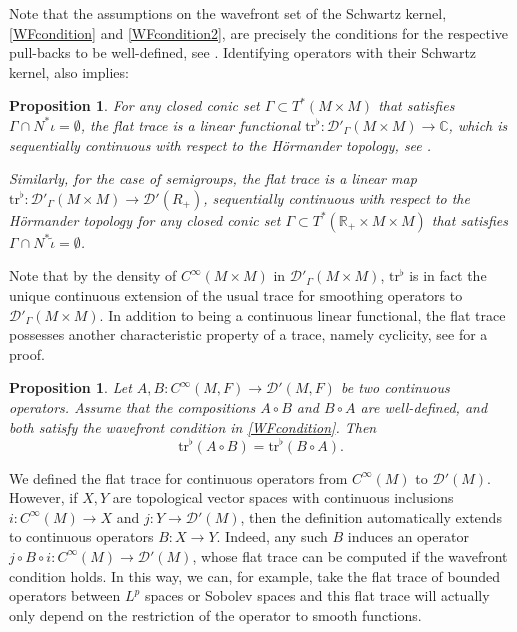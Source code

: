 \documentclass[reqno]{amsart}
\newtheorem{prop}[thm]{Proposition}
\theoremstyle{definition}
\theoremstyle{remark}
\newcommand{\R}{\mathbb{R}}
\newcommand{\D}{\mathcal{D}'}
\newcommand{\C}{C^\infty}
\newcommand{\tr}{\mathrm{tr}^\flat}
\begin{document}
Note that the assumptions on the wavefront set of the Schwartz kernel, \eqref{WFcondition} and \eqref{WFcondition2}, are precisely the conditions for the respective pull-backs to be well-defined, see \cite[Theorem 8.2.4]{hormander1}. Identifying operators with their Schwartz kernel, \cite[Theorem 8.2.4]{hormander1} also implies:

\begin{prop}
\label{continuity}
For any closed conic set $\Gamma \subset T^*(M\times M)$ that satisfies ${\Gamma \cap N^*\iota = \emptyset}$, the flat trace is a linear functional $\tr \colon \D_\Gamma(M\times M) \to \mathbb{C}$, which is sequentially continuous with respect to the H\"ormander topology, see \cite[Definition 8.2.2]{hormander1}.

Similarly, for the case of semigroups, the flat trace is a linear map $\tr \colon \D_\Gamma(M\times M) \to \D(R_+)$, sequentially continuous with respect to the Hörmander topology for any closed conic set $\Gamma \subset T^*(\R_+\times M\times M)$ that satisfies ${\Gamma \cap N^*\tilde{\iota} = \emptyset}$.
\end{prop}

Note that by the density of $\C(M\times M)$ in $\D_\Gamma(M\times M)$, $\tr$ is in fact the unique continuous extension of the usual trace for smoothing operators to $\D_\Gamma(M\times M)$. In addition to being a continuous linear functional, the flat trace possesses another characteristic property of a trace, namely cyclicity, see \cite[Section 4.5]{VietDangDynamicalTorsion} for a proof.
\begin{prop}
\label{cyclicity}
Let $A,B: \C(M,F) \to \D(M,F)$ be two continuous operators. Assume that the compositions $A\circ B$ and $B\circ A$ are well-defined,
and both satisfy the wavefront condition in \eqref{WFcondition}. Then
$$\tr(A\circ B) = \tr(B\circ A).$$
\end{prop}


\begin{rmk}
\label{spaces}
We defined the flat trace for continuous operators from $\C(M)$ to $\D(M)$. However, if $X, Y$ are topological vector spaces with continuous inclusions $i: \C(M) \to X$ and $j: Y \to \D(M)$, then the definition automatically extends to continuous operators $B:X\to Y$. Indeed, any such $B$ induces an operator $j\circ B\circ i \colon \C(M) \to \D(M)$, whose flat trace can be computed if the wavefront condition holds. In this way, we can, for example, take the flat trace of bounded operators between $L^p$ spaces or Sobolev spaces and this flat trace will actually only depend on the restriction of the operator to smooth functions.
\end{rmk}
\end{document}
